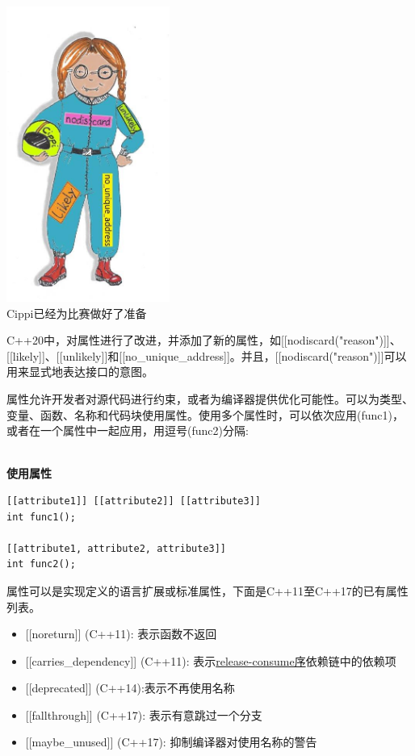 \begin{center}
\includegraphics[width=0.4\textwidth]{content/3/chapter4/images/44.png}\\
Cippi已经为比赛做好了准备
\end{center}

C++20中，对属性进行了改进，并添加了新的属性，如[[nodiscard("reason")]]、[[likely]]、[[unlikely]]和[[no\_unique\_address]]。并且，[[nodiscard("reason")]]可以用来显式地表达接口的意图。


\begin{tcolorbox}[breakable,enhanced jigsaw,colback=blue!5!white,colframe=blue!75!black,title={属性}]
属性允许开发者对源代码进行约束，或者为编译器提供优化可能性。可以为类型、变量、函数、名称和代码块使用属性。使用多个属性时，可以依次应用(func1)，或者在一个属性中一起应用，用逗号(func2)分隔:

\hspace*{\fill} \\ %
\noindent
\textbf{使用属性}
\begin{lstlisting}[style=styleCXX]
[[attribute1]] [[attribute2]] [[attribute3]]
int func1();

[[attribute1, attribute2, attribute3]]
int func2();
\end{lstlisting}

属性可以是实现定义的语言扩展或标准属性，下面是C++11至C++17的已有属性列表。

\begin{itemize}
\item 
{}[[noreturn]] (C++11): 表示函数不返回

\item 
{}[[carries\_dependency]] (C++11): 表示\href{https://en.cppreference.com/w/cpp/atomic/memory_order#Release-Consume_ordering}{release-consume序}依赖链中的依赖项

\item 
{}[[deprecated]] (C++14):表示不再使用名称

\item 
{}[[fallthrough]] (C++17): 表示有意跳过一个分支

\item 
{}[[maybe\_unused]] (C++17): 抑制编译器对使用名称的警告
\end{itemize}
\end{tcolorbox}



